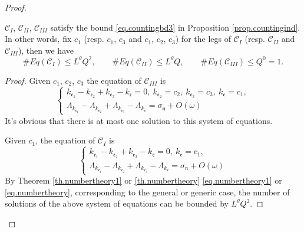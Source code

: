 \begin{proof}
     
    \begin{lem}\label{lem.countingbdunit}
    $\mathcal{C}_{I}$, $\mathcal{C}_{II}$, $\mathcal{C}_{III}$ satisfy the bound \eqref{eq.countingbd3} in Proposition \ref{prop.countingind}. In other words, fix $c_1$ (resp. $c_1$, $c_3$ and $c_1$, $c_2$, $c_3$) for the legs of $\mathcal{C}_{I}$ (resp. $\mathcal{C}_{II}$ and $\mathcal{C}_{III}$), then we have 
    \begin{equation}\label{eq.countingbdunit}
     \# Eq(\mathcal{C}_{I})\leq L^\theta Q^{2},\qquad \# Eq(\mathcal{C}_{II})\leq L^\theta Q,\qquad \# Eq(\mathcal{C}_{III})\leq Q^0=1.
    \end{equation}
    \end{lem}
    \begin{proof} Given $c_1$, $c_2$, $c_3$ the equation of $\mathcal{C}_{III}$ is 
     \begin{equation}
     \begin{cases}
     k_{\mathfrak{e}_1}-k_{\mathfrak{e}_2}+k_{\mathfrak{e}_3}-k_{\mathfrak{e}}=0,\ k_{\mathfrak{e}_2}=c_2,\ k_{\mathfrak{e}_3}=c_3,\ k_{\mathfrak{e}}=c_1,
     \\
     \Lambda_{k_{\mathfrak{e}_1}}-\Lambda_{k_{\mathfrak{e}_2}}+\Lambda_{k_{\mathfrak{e}_3}}-\Lambda_{k_{\mathfrak{e}}}=\sigma_{\mathfrak{n}}+O(\omega)
     \end{cases}
     \end{equation}
     It's obvious that there is at most one solution to this system of equations.
     
     Given $c_1$, the equation of $\mathcal{C}_{I}$ is 
     \begin{equation}
     \begin{cases}
     k_{\mathfrak{e}_1}-k_{\mathfrak{e}_2}+k_{\mathfrak{e}_3}-k_{\mathfrak{e}}=0,\ k_{\mathfrak{e}}=c_1,
     \\
     \Lambda_{k_{\mathfrak{e}_1}}-\Lambda_{k_{\mathfrak{e}_2}}+\Lambda_{k_{\mathfrak{e}_3}}-\Lambda_{k_{\mathfrak{e}}}=\sigma_{\mathfrak{n}}+O(\omega)
     \end{cases}
     \end{equation}
     By Theorem \ref{th.numbertheory1} or \ref{th.numbertheory} \eqref{eq.numbertheory1} or \eqref{eq.numbertheory}, corresponding to the general or generic case, the number of solutions of the above system of equations can be bounded by $ L^\theta Q^2$.
    

\end{proof}
\end{proof}
